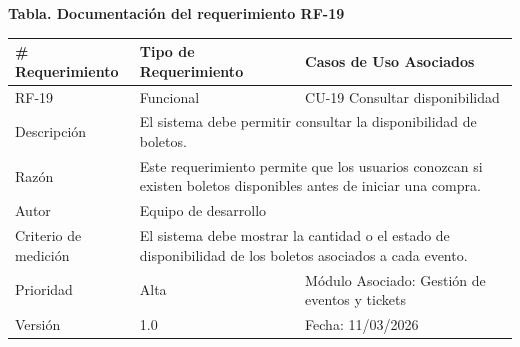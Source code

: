 \documentclass[12pt,letterpaper]{article}
\begin{document}
\noindent
\begin{minipage}{\textwidth}
\centering
\scriptsize
\renewcommand{\arraystretch}{0.9}
\setlength{\tabcolsep}{3pt}
\setlength{\arrayrulewidth}{0.5pt}

\textbf{Tabla. Documentación del requerimiento RF-19}

\vspace{2pt}

\begin{tabularx}{\textwidth}{|p{2.6cm}|X|p{3.4cm}|}
\hline
\# Requerimiento & Tipo de Requerimiento & Casos de Uso Asociados \\ \hline
RF-19 & Funcional & CU-19 Consultar disponibilidad \\ \hline
Descripción & \multicolumn{2}{X|}{El sistema debe permitir consultar la disponibilidad de boletos.} \\ \hline
Razón & \multicolumn{2}{X|}{Este requerimiento permite que los usuarios conozcan si existen boletos disponibles antes de iniciar una compra.} \\ \hline
Autor & \multicolumn{2}{X|}{Equipo de desarrollo} \\ \hline
Criterio de medición & \multicolumn{2}{X|}{El sistema debe mostrar la cantidad o el estado de disponibilidad de los boletos asociados a cada evento.} \\ \hline
Prioridad & Alta & Módulo Asociado: Gestión de eventos y tickets \\ \hline
Versión & 1.0 & Fecha: 11/03/2026 \\ \hline
\end{tabularx}
\end{minipage}

\vspace{0.2cm}
\end{document}
